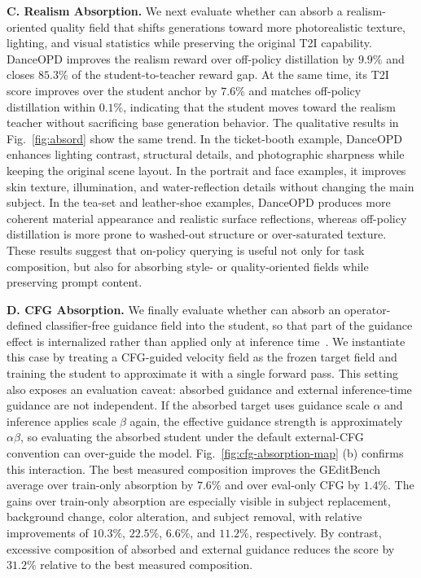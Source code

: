\noindent\textbf{C. Realism Absorption.}
We next evaluate whether \name{} can absorb a realism-oriented quality field that shifts generations toward more photorealistic texture, lighting, and visual statistics while preserving the original T2I capability. DanceOPD improves the realism reward over off-policy distillation by $9.9\%$ and closes $85.3\%$ of the student-to-teacher reward gap. At the same time, its T2I score improves over the student anchor by $7.6\%$ and matches off-policy distillation within $0.1\%$, indicating that the student moves toward the realism teacher without sacrificing base generation behavior. The qualitative results in Fig.~\ref{fig:absord} show the same trend. In the ticket-booth example, DanceOPD enhances lighting contrast, structural details, and photographic sharpness while keeping the original scene layout. In the portrait and face examples, it improves skin texture, illumination, and water-reflection details without changing the main subject. In the tea-set and leather-shoe examples, DanceOPD produces more coherent material appearance and realistic surface reflections, whereas off-policy distillation is more prone to washed-out structure or over-saturated texture. These results suggest that on-policy querying is useful not only for task composition, but also for absorbing style- or quality-oriented fields while preserving prompt content.

\noindent\textbf{D. CFG Absorption.}
We finally evaluate whether \name{} can absorb an operator-defined classifier-free guidance field into the student, so that part of the guidance effect is internalized rather than applied only at inference time~\cite{ho2022classifier}. We instantiate this case by treating a CFG-guided velocity field as the frozen target field and training the student to approximate it with a single forward pass. This setting also exposes an evaluation caveat: absorbed guidance and external inference-time guidance are not independent. If the absorbed target uses guidance scale $\alpha$ and inference applies scale $\beta$ again, the effective guidance strength is approximately $\alpha\beta$, so evaluating the absorbed student under the default external-CFG convention can over-guide the model. Fig.~\ref{fig:cfg-absorption-map} (b) confirms this interaction. The best measured composition improves the GEditBench average over train-only absorption by $7.6\%$ and over eval-only CFG by $1.4\%$. The gains over train-only absorption are especially visible in subject replacement, background change, color alteration, and subject removal, with relative improvements of $10.3\%$, $22.5\%$, $6.6\%$, and $11.2\%$, respectively. By contrast, excessive composition of absorbed and external guidance reduces the score by $31.2\%$ relative to the best measured composition.

